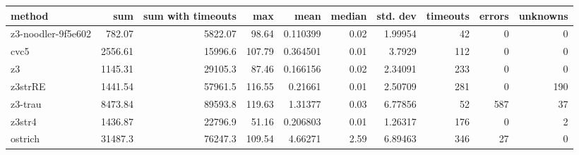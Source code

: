 \begin{tabular}{lrrrrrrrrr}
\hline
 method             &      sum &   sum with timeouts &    max &     mean &   median &   std. dev &   timeouts &   errors &   unknowns \\
\hline
 z3-noodler-9f5e602 &   782.07 &             5822.07 &  98.64 & 0.110399 &     0.02 &    1.99954 &         42 &        0 &          0 \\
 cvc5               &  2556.61 &            15996.6  & 107.79 & 0.364501 &     0.01 &    3.7929  &        112 &        0 &          0 \\
 z3                 &  1145.31 &            29105.3  &  87.46 & 0.166156 &     0.02 &    2.34091 &        233 &        0 &          0 \\
 z3strRE            &  1441.54 &            57961.5  & 116.55 & 0.21661  &     0.01 &    2.50709 &        281 &        0 &        190 \\
 z3-trau            &  8473.84 &            89593.8  & 119.63 & 1.31377  &     0.03 &    6.77856 &         52 &      587 &         37 \\
 z3str4             &  1436.87 &            22796.9  &  51.16 & 0.206803 &     0.01 &    1.26317 &        176 &        0 &          2 \\
 ostrich            & 31487.3  &            76247.3  & 109.54 & 4.66271  &     2.59 &    6.89463 &        346 &       27 &          0 \\
\hline
\end{tabular}
